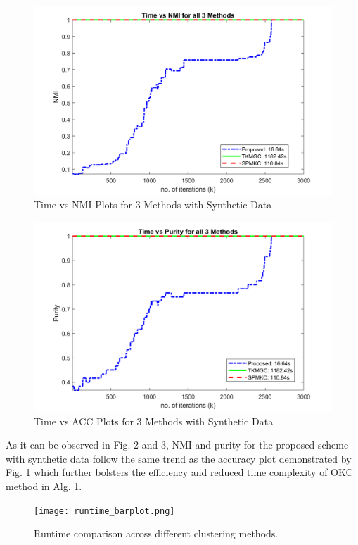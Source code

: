 \documentclass[10pt,final]{IEEEtran}
\begin{document}
\begin{figure}[htp]
    \centering
    \includegraphics[scale=0.2]{nmi_synthetic_plots.png}
    \caption{Time vs NMI Plots for 3 Methods with Synthetic Data}
    \label{Fig:2s}
\end{figure}
\begin{figure}[htp]
    \centering
    \includegraphics[scale=0.2]{purity_synthetic_plots.png}
    \caption{Time vs ACC Plots for 3 Methods with Synthetic Data}
    \label{Fig:3s}
\end{figure}
As it can be observed in Fig. 2 and 3, NMI and purity for the proposed scheme with synthetic data follow the same trend as the accuracy plot demonstrated by Fig. 1 which further bolsters the efficiency and reduced time complexity of OKC method in Alg. 1.
\begin{figure}[htp]\label{Fig_1}
    \centering
    \texttt{[image: runtime\_barplot.png]}
    \caption{Runtime comparison across different clustering methods.}
    \label{Fig:1}
\end{figure}
\end{document}
